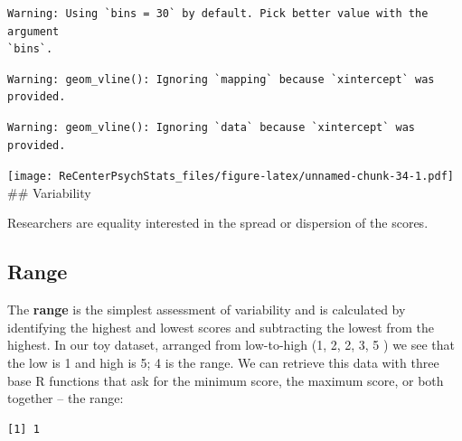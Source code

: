\documentclass[
  11pt,
]{book}
\newenvironment{Shaded}{\begin{snugshade}}{\end{snugshade}}
\newcommand{\AttributeTok}[1]{\textcolor[rgb]{0.77,0.63,0.00}{#1}}
\newcommand{\ConstantTok}[1]{\textcolor[rgb]{0.00,0.00,0.00}{#1}}
\newcommand{\FunctionTok}[1]{\textcolor[rgb]{0.00,0.00,0.00}{#1}}
\newcommand{\NormalTok}[1]{#1}
\newcommand{\SpecialCharTok}[1]{\textcolor[rgb]{0.00,0.00,0.00}{#1}}
\begin{document}
\begin{verbatim}
Warning: Using `bins = 30` by default. Pick better value with the argument
`bins`.
\end{verbatim}

\begin{verbatim}
Warning: geom_vline(): Ignoring `mapping` because `xintercept` was provided.
\end{verbatim}

\begin{verbatim}
Warning: geom_vline(): Ignoring `data` because `xintercept` was provided.
\end{verbatim}

\texttt{[image: ReCenterPsychStats\_files/figure-latex/unnamed-chunk-34-1.pdf]}
\#\# Variability

Researchers are equality interested in the spread or dispersion of the scores.

\hypertarget{range}{%
\subsection{Range}\label{range}}

The \textbf{range} is the simplest assessment of variability and is calculated by identifying the highest and lowest scores and subtracting the lowest from the highest. In our toy dataset, arranged from low-to-high (1, 2, 2, 3, 5 ) we see that the low is 1 and high is 5; 4 is the range. We can retrieve this data with three base R functions that ask for the minimum score, the maximum score, or both together -- the range:

\begin{Shaded}
\end{Shaded}

\begin{verbatim}
[1] 1
\end{verbatim}

\begin{Shaded}
\end{Shaded}
\end{document}
